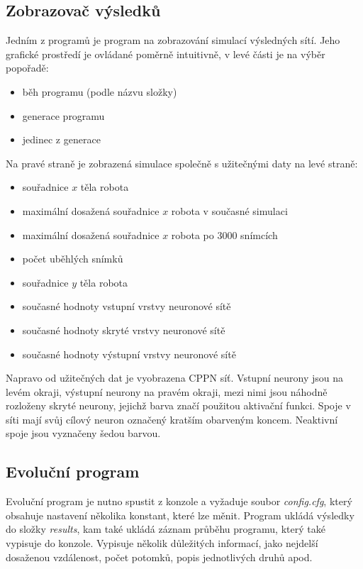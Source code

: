 \documentclass[a4]{article}
\begin{document}
\subsection{Zobrazovač výsledků}
Jedním z programů je program na zobrazování simulací výsledných sítí. Jeho grafické prostředí je ovládané poměrně intuitivně, v levé části je na výběr popořadě:
\begin{itemize}
\item{běh programu (podle názvu složky)}
\item{generace programu}
\item{jedinec z generace}
\end{itemize}
Na pravé straně je zobrazená simulace společně s užitečnými daty na levé straně:
\begin{itemize}
\item{souřadnice $x$ těla robota}
\item{maximální dosažená souřadnice $x$ robota v současné simulaci}
\item{maximální dosažená souřadnice $x$ robota po 3000 snímcích}
\item{počet uběhlých snímků}
\item{souřadnice $y$ těla robota}
\item{současné hodnoty vstupní vrstvy neuronové sítě}
\item{současné hodnoty skryté vrstvy neuronové sítě}
\item{současné hodnoty výstupní vrstvy neuronové sítě}
\end{itemize}
Napravo od užitečných dat je vyobrazena CPPN síť. Vstupní neurony jsou na levém okraji, výstupní neurony na pravém okraji, mezi nimi jsou náhodně rozloženy skryté neurony, jejichž barva značí použitou aktivační funkci. Spoje v síti mají svůj cílový neuron označený kratším obarveným koncem. Neaktivní spoje jsou vyznačeny šedou barvou.
\subsection{Evoluční program}
Evoluční program je nutno spustit z konzole a vyžaduje soubor \emph{config.cfg}, který obsahuje nastavení několika konstant, které lze měnit. Program ukládá výsledky do složky \emph{results}, kam také ukládá záznam průběhu programu, který také vypisuje do konzole. Vypisuje několik důležitých informací, jako nejdelší dosaženou vzdálenost, počet potomků, popis jednotlivých druhů apod.
\end{document}
